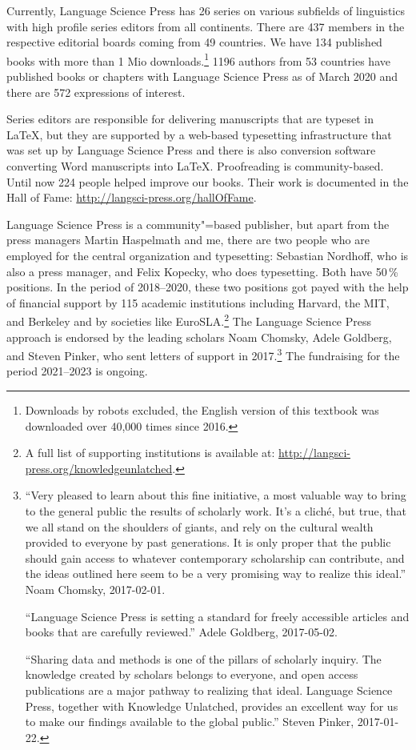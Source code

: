 Currently, Language Science Press has 26 series on various subfields of linguistics with high
profile series editors from all continents. There are 437 members in the respective editorial boards
coming from 49 countries. We have 134 published books with more than 1 Mio downloads.\footnote{%
Downloads by robots excluded, the English version of this textbook was downloaded over 40,000 times
since 2016.
} 1196 authors from 53 countries have published books or chapters with Language Science Press as of March 2020 and there are
572 expressions of interest. 


Series editors are responsible for delivering manuscripts that are typeset in \LaTeX{}, but they are
supported by a web-based typesetting infrastructure that was set up by Language Science Press and
there is also conversion software converting Word manuscripts into \LaTeX{}. Proofreading is
community-based. Until now 224 people helped improve our books. Their work is documented in the
Hall of Fame: \url{http://langsci-press.org/hallOfFame}.


Language Science Press is a community"=based publisher, but apart from the press managers Martin
Haspelmath and me, there are two people who are employed for the central organization and
typesetting: Sebastian Nordhoff, who is also a press manager, and Felix Kopecky, who does 
typesetting. Both have 50\,\% positions. In the period of 2018--2020, these two positions got payed
with the help of financial support by 115 academic institutions including  
Harvard, the MIT, and Berkeley and by societies like EuroSLA.\footnote{%
  A full list of supporting institutions is available at:
  \url{http://langsci-press.org/knowledgeunlatched}.
} The Language Science Press approach is endorsed by the leading scholars Noam Chomsky, Adele
Goldberg, and Steven Pinker, who sent letters of support in 2017.\footnote{%
``Very pleased to learn about this fine initiative, a most valuable way to
bring to the general public the results of scholarly work.  It's a
cliché, but true, that we all stand on the shoulders of giants, and rely
on the cultural wealth provided to everyone by past generations.  It is
only proper that the public should gain access to whatever contemporary
scholarship can contribute, and the ideas outlined here seem to be a
very promising way to realize this ideal.'' Noam Chomsky, 2017-02-01.
 
``Language Science Press is setting a standard for freely accessible
articles and books that are carefully reviewed.'' Adele Goldberg, 2017-05-02. 

``Sharing data and methods is one of the pillars of scholarly inquiry. The knowledge created by
scholars belongs to everyone, and open access publications are a major pathway to realizing that
ideal. Language Science Press, together with Knowledge Unlatched, provides an excellent way for us
to make our findings available to the global public.'' Steven Pinker, 2017-01-22. 
} The fundraising for the period 2021--2023 is ongoing.

